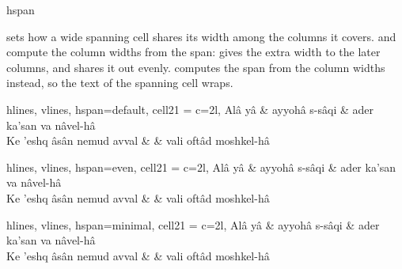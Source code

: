 \begin{codedescribe}[
    key,
    new=2021H
  ]{hspan}
  \begin{codesyntax}
  \end{codesyntax}
   sets how a wide spanning cell shares its width among the columns it covers.  and  compute the column widths from the span:  gives the extra width to the later columns, and  shares it out evenly.  computes the span from the column widths instead, so the text of the spanning cell wraps.

  \begin{codestore}[st=span:hspan]
    \begin{tblr}{
        hlines, vlines, hspan=default,
        cell{2}{1} = {c=2}{l},
      }
      Alâ yâ                    & ayyohâ s-sâqi & ader ka’san va nâvel-hâ \\
      Ke ’eshq âsân nemud avval &               & vali oftâd moshkel-hâ
    \end{tblr}

    \begin{tblr}{
        hlines, vlines, hspan=even,
        cell{2}{1} = {c=2}{l},
      }
      Alâ yâ                    & ayyohâ s-sâqi & ader ka’san va nâvel-hâ \\
      Ke ’eshq âsân nemud avval &               & vali oftâd moshkel-hâ
    \end{tblr}

    \begin{tblr}{
        hlines, vlines, hspan=minimal,
        cell{2}{1} = {c=2}{l},
      }
      Alâ yâ                    & ayyohâ s-sâqi & ader ka’san va nâvel-hâ \\
      Ke ’eshq âsân nemud avval &               & vali oftâd moshkel-hâ
    \end{tblr}\end{codestore}
  \begin{center}
  \end{center}
\end{codedescribe}

